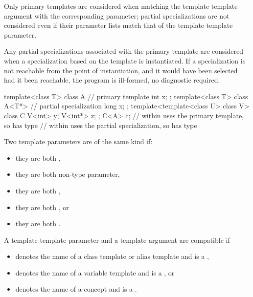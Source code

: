 \documentclass{wg21}
\begin{document}
Only primary templates are considered when matching the template template
argument with the corresponding parameter; partial specializations are not
considered even if their parameter lists match that of the template template
parameter.

\pnum
Any partial specializations  associated with the
primary template are considered when a
specialization based on the template
is instantiated.
If a specialization is not reachable from the point of instantiation,
and it would have been selected had it been reachable, the program is ill-formed,
no diagnostic required.
\begin{example}
    \begin{codeblock}
        template<class T> class A {     // primary template
            int x;
        };
        template<class T> class A<T*> { // partial specialization
            long x;
        };
        template<template<class U> class V> class C {
            V<int>  y;
            V<int*> z;
        };
        C<A> c;             //  within  uses the primary template, so  has type 
        //  within  uses the partial specialization, so  has type 
    \end{codeblock}
\end{example}

\begin{addedblock}
Two template parameters are of the same kind if:
\begin{itemize}
\item they are both ,
\item they are both non-type parameter,
\item they are both ,
\item they are both , or
\item they are both .
\end{itemize}

A template template parameter  and a template argument  are compatible if
\begin{itemize}
\item {} denotes the name of a class template or alias template and  is a ,
\item {} denotes the name of a variable template and  is a , or
\item {} denotes the name of a concept and  is a .
\end{itemize}

\end{addedblock}
\end{document}
